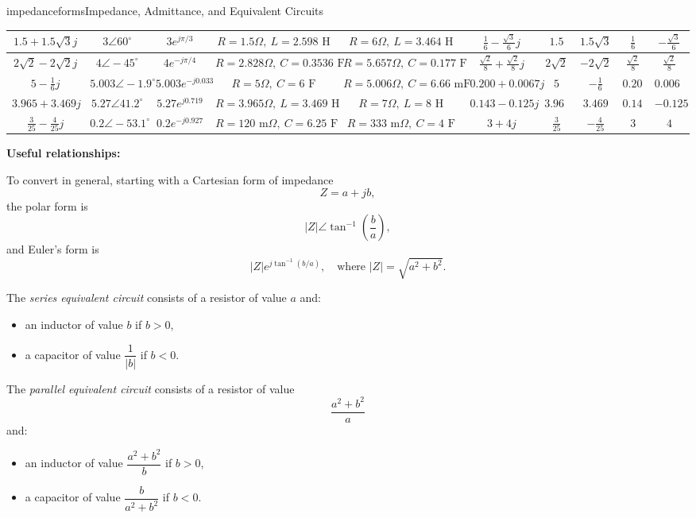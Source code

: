\begin{mainquestion}{impedanceforms}{Impedance, Admittance, and Equivalent Circuits}
\begin{answer}
\begin{center}
{\begin{tabular}{|c|c|c|c|c|c|c|c|c|c|}
$1.5 + 1.5\sqrt{3}j$ &
$3\angle 60^\circ$ &
$3e^{j\pi/3}$ &
$R=1.5\Omega,\ L=2.598\text{ H}$ &
$R=6\Omega,\ L=3.464\text{ H}$ &
$\frac16 - \frac{\sqrt3}{6}j$ &
$1.5$ &
$1.5\sqrt3$ &
$\frac16$ &
$-\frac{\sqrt3}{6}$ \\ \hline

$2\sqrt2 - 2\sqrt2 j$ &
$4\angle -45^\circ$ &
$4e^{-j\pi/4}$ &
$R=2.828\Omega,\ C=0.3536\text{ F}$ &
$R=5.657\Omega,\ C=0.177\text{ F}$ &
$\frac{\sqrt2}{8} + \frac{\sqrt2}{8}j$ &
$2\sqrt2$ &
$-2\sqrt2$ &
$\frac{\sqrt2}{8}$ &
$\frac{\sqrt2}{8}$ \\ \hline

$5 - \frac16 j$ &
$5.003\angle -1.9^\circ$ &
$5.003e^{-j0.033}$ &
$R=5\Omega,\ C=6\text{ F}$ &
$R=5.006\Omega,\ C=6.66\text{ mF}$ &
$0.200 + 0.0067j$ &
$5$ &
$-\frac16$ &
$0.200$ &
$0.0067$ \\ \hline

$3.965 + 3.469j$ &
$5.27\angle 41.2^\circ$ &
$5.27e^{j0.719}$ &
$R=3.965\Omega,\ L=3.469\text{ H}$ &
$R=7\Omega,\ L=8\text{ H}$ &
$0.143 - 0.125j$ &
$3.965$ &
$3.469$ &
$0.143$ &
$-0.125$ \\ \hline

$\frac{3}{25} - \frac{4}{25}j$ &
$0.2\angle -53.1^\circ$ &
$0.2e^{-j0.927}$ &
$R=120\text{ m}\Omega,\ C=6.25\text{ F}$ &
$R=333\text{ m}\Omega,\ C=4\text{ F}$ &
$3 + 4j$ &
$\frac{3}{25}$ &
$-\frac{4}{25}$ &
$3$ &
$4$ \\ \hline

\end{tabular}
}
\end{center}

\bigskip

\textbf{Useful relationships:}

To convert in general, starting with a Cartesian form of impedance
\[
Z = a + jb,
\]
the polar form is
\[
|Z| \angle \tan^{-1}\!\left(\frac{b}{a}\right),
\]
and Euler’s form is
\[
|Z| e^{j\tan^{-1}(b/a)},
\quad \text{where } |Z| = \sqrt{a^2 + b^2}.
\]

\medskip

The \emph{series equivalent circuit} consists of a resistor of value $a$ and:
\begin{itemize}
\item an inductor of value $b$ if $b > 0$,
\item a capacitor of value $\dfrac{1}{|b|}$ if $b < 0$.
\end{itemize}

\medskip

The \emph{parallel equivalent circuit} consists of a resistor of value
\[
\frac{a^2 + b^2}{a}
\]
and:
\begin{itemize}
\item an inductor of value $\dfrac{a^2 + b^2}{b}$ if $b > 0$,
\item a capacitor of value $\dfrac{b}{a^2 + b^2}$ if $b < 0$.
\end{itemize}


\end{answer}
\end{mainquestion}
